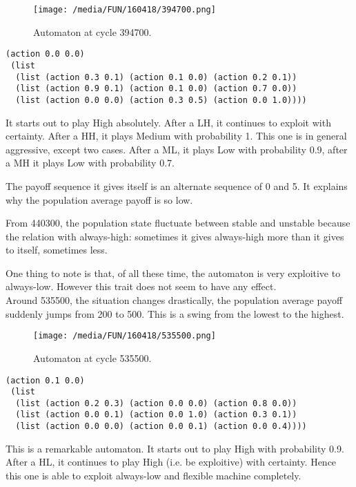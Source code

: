 \documentclass[12.5pt]{report}
\begin{document}
\begin{figure}[h!]
\center
\texttt{[image: /media/FUN/160418/394700.png]}
\caption{Automaton at cycle 394700.}
\end{figure}

\begin{verbatim}
(action 0.0 0.0)
 (list
  (list (action 0.3 0.1) (action 0.1 0.0) (action 0.2 0.1))
  (list (action 0.9 0.1) (action 0.1 0.0) (action 0.7 0.0))
  (list (action 0.0 0.0) (action 0.3 0.5) (action 0.0 1.0))))
\end{verbatim}

It starts out to play High absolutely. After a LH, it continues to exploit with certainty. After a HH, it plays Medium with probability 1. This one is in general aggressive, except two cases. After a ML, it plays Low with probability 0.9, after a MH it plays Low with probability 0.7.

The payoff sequence it gives itself is an alternate sequence of 0 and 5. It explains why the population average payoff is so low.

From 440300, the population state fluctuate between stable and unstable because the relation with always-high: sometimes it gives always-high more than it gives to itself, sometimes less.

One thing to note is that, of all these time, the automaton is very exploitive to always-low. However this trait does not seem to have any effect. \\


Around 535500, the situation changes drastically, the population average payoff suddenly jumps from 200 to 500. This is a swing from the lowest to the highest.

\begin{figure}[h!]
\center
\texttt{[image: /media/FUN/160418/535500.png]}
\caption{Automaton at cycle 535500.}
\end{figure}

\begin{verbatim}
(action 0.1 0.0)
 (list
  (list (action 0.2 0.3) (action 0.0 0.0) (action 0.8 0.0))
  (list (action 0.0 0.1) (action 0.0 1.0) (action 0.3 0.1))
  (list (action 0.0 0.0) (action 0.0 0.1) (action 0.0 0.4))))

\end{verbatim}

This is a remarkable automaton. It starts out to play High with probability 0.9. After a HL, it continues to play High (i.e. be exploitive) with certainty. Hence this one is able to exploit always-low and flexible machine completely.\\
\end{document}
